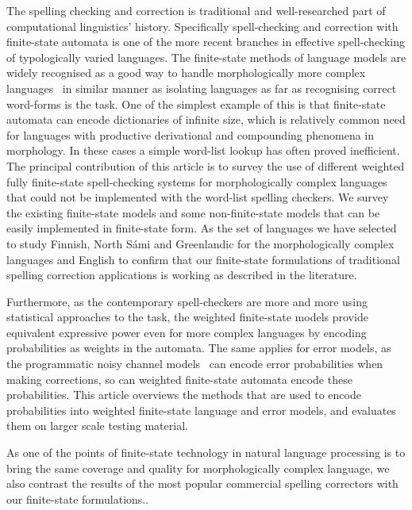 \documentclass[a4paper,12pt]{article}
\begin{document}
The spelling checking and correction is traditional and well-researched part of
computational linguistics' history. Specifically spell-checking and correction
with finite-state automata is one of the more recent branches in effective
spell-checking of typologically varied languages. The finite-state methods of
language models are widely recognised as a good way to handle morphologically
more complex languages~\cite[]{beesley2003finite} in similar manner as
isolating languages as far as recognising correct word-forms is the task. One
of the simplest example of this is that finite-state automata can encode
dictionaries of infinite size, which is relatively common need for languages
with productive derivational and compounding phenomena in morphology.  In these
cases a simple word-list lookup has often proved inefficient. The principal
contribution of this article is to survey the use of different weighted
fully finite-state spell-checking systems for morphologically complex
languages that could not be implemented with the word-list spelling checkers.
We survey the existing finite-state models and some non-finite-state models
that can be easily implemented in finite-state form.  As the set of languages
we have selected to study Finnish, North Sámi and Greenlandic for the
morphologically complex languages and English to confirm that our finite-state
formulations of traditional spelling correction applications is working as
described in the literature.

Furthermore, as the contemporary spell-checkers are more and more using
statistical approaches to the task, the weighted finite-state models provide
equivalent expressive power even for more complex languages by encoding
probabilities as weights in the automata.  The same applies for error models,
as the programmatic noisy channel models~\cite[]{brill2000improved} can encode
error probabilities when making corrections, so can weighted finite-state
automata encode these probabilities. This article overviews the methods that
are used to encode probabilities into weighted finite-state language and error
models, and evaluates them on larger scale testing material.

As one of the points of finite-state technology in natural language processing
is to bring the same coverage and quality for morphologically complex language,
we also contrast the results of the most popular commercial spelling correctors
with our finite-state formulations..
\end{document}
